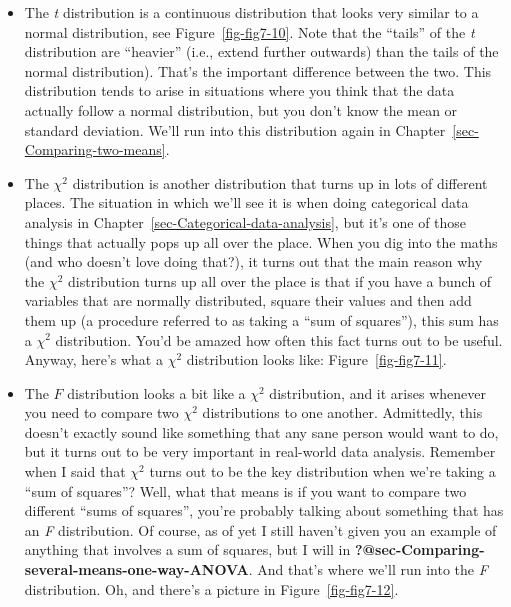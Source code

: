 \documentclass[
  a4paper,
]{book}
\providecommand{\tightlist}{%
  \setlength{\itemsep}{0pt}\setlength{\parskip}{0pt}}\usepackage{longtable,booktabs,array}
\begin{document}
\begin{itemize}
\tightlist
\item
  The \emph{t} distribution is a continuous distribution that looks very
  similar to a normal distribution, see Figure~\ref{fig-fig7-10}. Note
  that the ``tails'' of the \emph{t} distribution are ``heavier'' (i.e.,
  extend further outwards) than the tails of the normal distribution).
  That's the important difference between the two. This distribution
  tends to arise in situations where you think that the data actually
  follow a normal distribution, but you don't know the mean or standard
  deviation. We'll run into this distribution again in
  Chapter~\ref{sec-Comparing-two-means}.
\item
  The \(\chi^2\) distribution is another distribution that turns up in
  lots of different places. The situation in which we'll see it is when
  doing categorical data analysis in
  Chapter~\ref{sec-Categorical-data-analysis}, but it's one of those
  things that actually pops up all over the place. When you dig into the
  maths (and who doesn't love doing that?), it turns out that the main
  reason why the \(\chi^2\) distribution turns up all over the place is
  that if you have a bunch of variables that are normally distributed,
  square their values and then add them up (a procedure referred to as
  taking a ``sum of squares''), this sum has a \(\chi^2\) distribution.
  You'd be amazed how often this fact turns out to be useful. Anyway,
  here's what a \(\chi^2\) distribution looks like:
  Figure~\ref{fig-fig7-11}.
\item
  The \(F\) distribution looks a bit like a \(\chi^2\) distribution, and
  it arises whenever you need to compare two \(\chi^2\) distributions to
  one another. Admittedly, this doesn't exactly sound like something
  that any sane person would want to do, but it turns out to be very
  important in real-world data analysis. Remember when I said that
  \(\chi^2\) turns out to be the key distribution when we're taking a
  ``sum of squares''? Well, what that means is if you want to compare
  two different ``sums of squares'', you're probably talking about
  something that has an \emph{F} distribution. Of course, as of yet I
  still haven't given you an example of anything that involves a sum of
  squares, but I will in
  \textbf{?@sec-Comparing-several-means-one-way-ANOVA}. And that's where
  we'll run into the \emph{F} distribution. Oh, and there's a picture in
  Figure~\ref{fig-fig7-12}.
\end{itemize}
\end{document}

